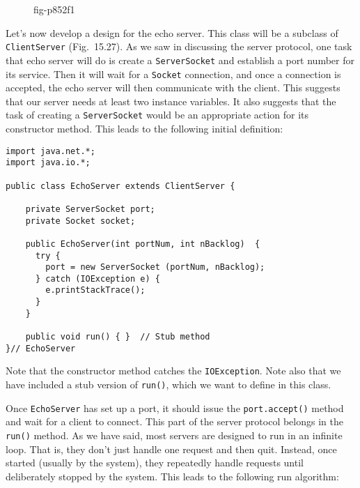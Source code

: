 {\begin{figure}[ht]
 {fig-p852f1}
\end{figure}


\noindent Let's now develop a design for the echo server.  This class will be a
subclass of {\tt ClientServer} (Fig.~15.27). As we saw in
discussing the server protocol, one task that echo server will do is
create a {\tt ServerSocket} and establish a port number for its
service.  Then it will wait for a {\tt Socket} connection, and once a
connection is accepted, the echo server will then communicate with the client.
This suggests that
our server needs at least two instance variables.  It also suggests
that the task of creating a {\tt ServerSocket} would be an appropriate
action for its constructor method.  This leads to the following initial
definition:

\begin{jjjlisting}
\begin{lstlisting}
import java.net.*;
import java.io.*;

public class EchoServer extends ClientServer {

    private ServerSocket port;
    private Socket socket;

    public EchoServer(int portNum, int nBacklog)  {
      try {
        port = new ServerSocket (portNum, nBacklog);
      } catch (IOException e) {
        e.printStackTrace();
      }
    }

    public void run() { }  // Stub method
}// EchoServer
\end{lstlisting}
\end{jjjlisting}

\noindent Note that the constructor method catches the {\tt IOException}.
Note also that we have included a stub version of {\tt run()}, which
we want to define in this class.

Once {\tt EchoServer} has set up a port, it should issue the
{\tt port.accept()} method and wait for a client to connect.  This part
of the server protocol belongs in the {\tt run()} method.   As we have said, most servers
are designed to run in an infinite loop.  That is, they don't just
handle one request and then quit.  Instead, once started (usually by
the system), they repeatedly handle requests until deliberately
stopped by the system.  This leads to the following run algorithm:

}
